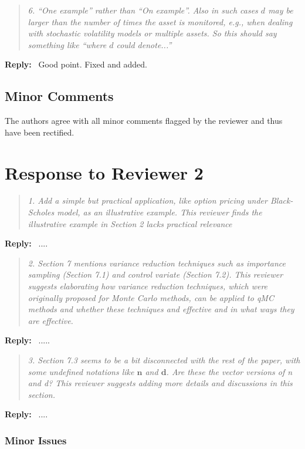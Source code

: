 \documentclass[11pt]{article}
\newenvironment{response}{%
  \vspace{1em}
  \begin{quote}\itshape
}{%
  \end{quote}
  \noindent\textbf{Reply:}~
}
\begin{document}
\begin{response}{6.}
“One example” rather than “On example”. Also in such cases $d$ may be larger than the number of times the asset is monitored, e.g., when dealing with stochastic volatility models or multiple assets. So this should say something like “where $d$ could denote...”
\end{response}
Good point. Fixed and added.


\subsection*{Minor Comments}

The authors agree with all minor comments  flagged by the reviewer and thus have been rectified.



\newpage

\section*{Response to Reviewer 2}


\begin{response}{1.}
    Add a simple but practical application, like option pricing under Black-Scholes model, as an illustrative example. This reviewer finds the illustrative example in Section 2 lacks practical relevance
\end{response}
....



\begin{response}{2.}
    Section 7 mentions variance reduction techniques such as importance sampling (Section 7.1) and control variate (Section 7.2). This reviewer suggests elaborating how variance reduction techniques, which were originally proposed for Monte Carlo methods, can be applied to qMC methods and whether these techniques and effective and in what ways they are effective.
\end{response}
.....



\begin{response}{3.}
    Section 7.3 seems to be a bit disconnected with the rest of the paper, with some undefined notations like $\boldsymbol{n}$ and $\boldsymbol{d}$. Are these the vector versions of n and d? This reviewer suggests adding more details and discussions in this section.
\end{response}
....

\subsubsection*{Minor Issues}
\end{document}
